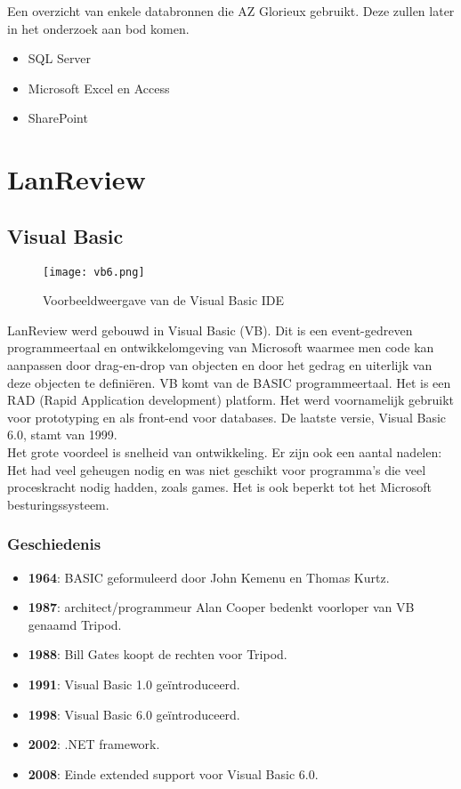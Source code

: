 Een overzicht van enkele databronnen die AZ Glorieux gebruikt. Deze zullen later in het onderzoek aan bod komen.

\begin{itemize}
    \item SQL Server
    \item Microsoft Excel en Access
    \item SharePoint
\end{itemize}

\section{LanReview}

\subsection{Visual Basic}

\begin{figure}[h!]
    \texttt{[image: vb6.png]}
    \caption{Voorbeeldweergave van de Visual Basic IDE \autocite{Speed2020}}
    \label{fig:vb6ide}
\end{figure}

LanReview werd gebouwd in Visual Basic (VB). Dit is een event-gedreven programmeertaal en ontwikkelomgeving van Microsoft waarmee men code kan aanpassen door drag-en-drop van objecten en door het gedrag en uiterlijk van deze objecten te definiëren. VB komt van de BASIC programmeertaal. Het is een RAD (Rapid Application development) platform. Het werd voornamelijk gebruikt voor prototyping en als front-end voor databases. De laatste versie, Visual Basic 6.0, stamt van 1999.\\
Het grote voordeel is snelheid van ontwikkeling. Er zijn ook een aantal nadelen:
Het had veel geheugen nodig en was niet geschikt voor programma's die veel proceskracht nodig hadden, zoals games. Het is ook beperkt tot het Microsoft besturingssysteem.

\autocite{Rouse2019}

\subsubsection{Geschiedenis}

\begin{itemize}
    \item \textbf{1964}: BASIC geformuleerd door John Kemenu en Thomas Kurtz.
    \item \textbf{1987}: architect/programmeur Alan Cooper bedenkt voorloper van VB genaamd Tripod.
    \item \textbf{1988}: Bill Gates koopt de rechten voor Tripod.
    \item \textbf{1991}: Visual Basic 1.0 geïntroduceerd.
    \item \textbf{1998}: Visual Basic 6.0 geïntroduceerd.
    \item \textbf{2002}: .NET framework.
    \item \textbf{2008}: Einde extended support voor Visual Basic 6.0.
\end{itemize} \autocite{Grigonis2014}

